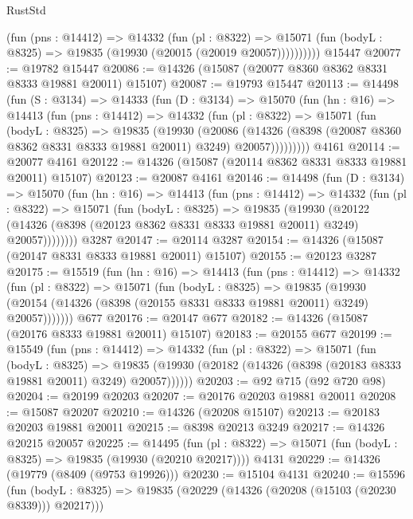 \begin{lexlean}{RustStd}
\begin{coremodule}
            (fun (pns : @14412) =>
            @14332
              (fun (pl : @8322) =>
              @15071 (fun (bodyL : @8325) => @19835 (@19930 (@20015 (@20019 @20057))))))))))
    @15447
@20077 := @19782 @15447
@20086 := @14326 (@15087 (@20077 @8360 @8362 @8331 @8333 @19881 @20011) @15107)
@20087 := @19793 @15447
@20113 := @14498
    (fun (S : @3134) =>
    @14333
      (fun (D : @3134) =>
      @15070
        (fun (hn : @16) =>
        @14413
          (fun (pns : @14412) =>
          @14332
            (fun (pl : @8322) =>
            @15071
              (fun (bodyL : @8325) =>
              @19835
                (@19930
                  (@20086
                    (@14326
                      (@8398 (@20087 @8360 @8362 @8331 @8333 @19881 @20011) @3249)
                      @20057)))))))))
    @4161
@20114 := @20077 @4161
@20122 := @14326 (@15087 (@20114 @8362 @8331 @8333 @19881 @20011) @15107)
@20123 := @20087 @4161
@20146 := @14498
    (fun (D : @3134) =>
    @15070
      (fun (hn : @16) =>
      @14413
        (fun (pns : @14412) =>
        @14332
          (fun (pl : @8322) =>
          @15071
            (fun (bodyL : @8325) =>
            @19835
              (@19930
                (@20122
                  (@14326 (@8398 (@20123 @8362 @8331 @8333 @19881 @20011) @3249) @20057))))))))
    @3287
@20147 := @20114 @3287
@20154 := @14326 (@15087 (@20147 @8331 @8333 @19881 @20011) @15107)
@20155 := @20123 @3287
@20175 := @15519
    (fun (hn : @16) =>
    @14413
      (fun (pns : @14412) =>
      @14332
        (fun (pl : @8322) =>
        @15071
          (fun (bodyL : @8325) =>
          @19835
            (@19930 (@20154 (@14326 (@8398 (@20155 @8331 @8333 @19881 @20011) @3249) @20057)))))))
    @677
@20176 := @20147 @677
@20182 := @14326 (@15087 (@20176 @8333 @19881 @20011) @15107)
@20183 := @20155 @677
@20199 := @15549
    (fun (pns : @14412) =>
    @14332
      (fun (pl : @8322) =>
      @15071
        (fun (bodyL : @8325) =>
        @19835 (@19930 (@20182 (@14326 (@8398 (@20183 @8333 @19881 @20011) @3249) @20057))))))
@20203 := @92 @715 (@92 @720 @98)
@20204 := @20199 @20203
@20207 := @20176 @20203 @19881 @20011
@20208 := @15087 @20207
@20210 := @14326 (@20208 @15107)
@20213 := @20183 @20203 @19881 @20011
@20215 := @8398 @20213 @3249
@20217 := @14326 @20215 @20057
@20225 := @14495
    (fun (pl : @8322) => @15071 (fun (bodyL : @8325) => @19835 (@19930 (@20210 @20217))))
    @4131
@20229 := @14326 (@19779 (@8409 (@9753 @19926)))
@20230 := @15104 @4131
@20240 := @15596
    (fun (bodyL : @8325) => @19835 (@20229 (@14326 (@20208 (@15103 (@20230 @8339))) @20217)))

\end{coremodule}
\end{lexlean}
